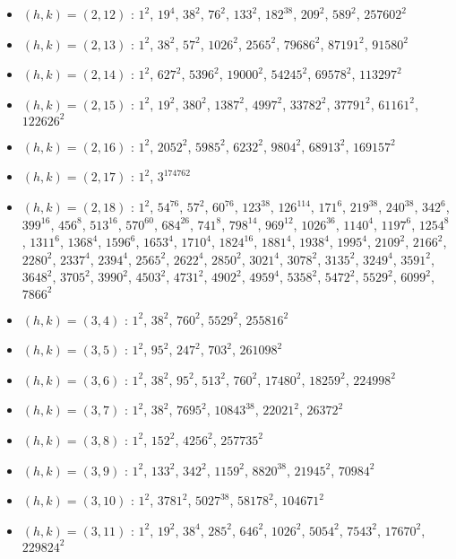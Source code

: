 \begin{itemize}
\item $(h,k)=(2,12)$ : $1^{2}$, $19^{4}$, $38^{2}$, $76^{2}$, $133^{2}$, $182^{38}$, $209^{2}$, $589^{2}$, $257602^{2}$
\item $(h,k)=(2,13)$ : $1^{2}$, $38^{2}$, $57^{2}$, $1026^{2}$, $2565^{2}$, $79686^{2}$, $87191^{2}$, $91580^{2}$
\item $(h,k)=(2,14)$ : $1^{2}$, $627^{2}$, $5396^{2}$, $19000^{2}$, $54245^{2}$, $69578^{2}$, $113297^{2}$
\item $(h,k)=(2,15)$ : $1^{2}$, $19^{2}$, $380^{2}$, $1387^{2}$, $4997^{2}$, $33782^{2}$, $37791^{2}$, $61161^{2}$, $122626^{2}$
\item $(h,k)=(2,16)$ : $1^{2}$, $2052^{2}$, $5985^{2}$, $6232^{2}$, $9804^{2}$, $68913^{2}$, $169157^{2}$
\item $(h,k)=(2,17)$ : $1^{2}$, $3^{174762}$
\item $(h,k)=(2,18)$ : $1^{2}$, $54^{76}$, $57^{2}$, $60^{76}$, $123^{38}$, $126^{114}$, $171^{6}$, $219^{38}$, $240^{38}$, $342^{6}$, $399^{16}$, $456^{8}$, $513^{16}$, $570^{60}$, $684^{26}$, $741^{8}$, $798^{14}$, $969^{12}$, $1026^{36}$, $1140^{4}$, $1197^{6}$, $1254^{8}$, $1311^{6}$, $1368^{4}$, $1596^{6}$, $1653^{4}$, $1710^{4}$, $1824^{16}$, $1881^{4}$, $1938^{4}$, $1995^{4}$, $2109^{2}$, $2166^{2}$, $2280^{2}$, $2337^{4}$, $2394^{4}$, $2565^{2}$, $2622^{4}$, $2850^{2}$, $3021^{4}$, $3078^{2}$, $3135^{2}$, $3249^{4}$, $3591^{2}$, $3648^{2}$, $3705^{2}$, $3990^{2}$, $4503^{2}$, $4731^{2}$, $4902^{2}$, $4959^{4}$, $5358^{2}$, $5472^{2}$, $5529^{2}$, $6099^{2}$, $7866^{2}$
\item $(h,k)=(3,4)$ : $1^{2}$, $38^{2}$, $760^{2}$, $5529^{2}$, $255816^{2}$
\item $(h,k)=(3,5)$ : $1^{2}$, $95^{2}$, $247^{2}$, $703^{2}$, $261098^{2}$
\item $(h,k)=(3,6)$ : $1^{2}$, $38^{2}$, $95^{2}$, $513^{2}$, $760^{2}$, $17480^{2}$, $18259^{2}$, $224998^{2}$
\item $(h,k)=(3,7)$ : $1^{2}$, $38^{2}$, $7695^{2}$, $10843^{38}$, $22021^{2}$, $26372^{2}$
\item $(h,k)=(3,8)$ : $1^{2}$, $152^{2}$, $4256^{2}$, $257735^{2}$
\item $(h,k)=(3,9)$ : $1^{2}$, $133^{2}$, $342^{2}$, $1159^{2}$, $8820^{38}$, $21945^{2}$, $70984^{2}$
\item $(h,k)=(3,10)$ : $1^{2}$, $3781^{2}$, $5027^{38}$, $58178^{2}$, $104671^{2}$
\item $(h,k)=(3,11)$ : $1^{2}$, $19^{2}$, $38^{4}$, $285^{2}$, $646^{2}$, $1026^{2}$, $5054^{2}$, $7543^{2}$, $17670^{2}$, $229824^{2}$

\end{itemize}
